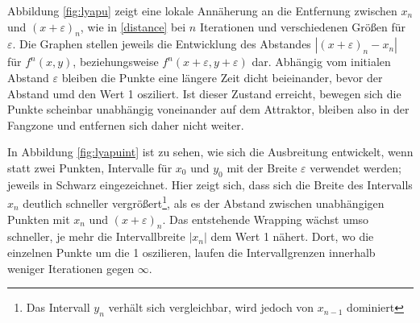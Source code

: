  
 Abbildung \ref{fig:lyapu} zeigt eine lokale Annäherung an die Entfernung zwischen $x_n$ und $(x+\varepsilon)_n$, wie in \ref{distance} bei $n$ Iterationen und verschiedenen Größen für $\varepsilon$. Die Graphen stellen jeweils die Entwicklung des Abstandes $|(x+\varepsilon)_n - x_n|$ für $f^n(x,y)$, beziehungsweise $f^n(x+\varepsilon,y+\varepsilon)$ dar. Abhängig vom initialen Abstand $\varepsilon$ bleiben die Punkte eine längere Zeit dicht beieinander, bevor der Abstand umd den Wert 1 osziliert. Ist dieser Zustand erreicht, bewegen sich die Punkte scheinbar unabhängig voneinander auf dem Attraktor, bleiben also in der Fangzone und entfernen sich daher nicht weiter. 

 
 
 In Abbildung \ref{fig:lyapuint} ist zu sehen, wie sich die Ausbreitung entwickelt, wenn statt zwei Punkten, Intervalle für $x_0$ und $y_0$ mit der Breite $\varepsilon$ verwendet werden; jeweils in Schwarz eingezeichnet. Hier zeigt sich, dass sich die Breite des Intervalls $x_n$ deutlich schneller vergrößert\footnote{Das Intervall $y_n$ verhält sich vergleichbar, wird jedoch von $x_{n-1}$ dominiert}, als es der Abstand zwischen unabhängigen Punkten mit $x_n$ und $(x+\varepsilon)_n$. Das entstehende Wrapping wächst umso schneller, je mehr die Intervallbreite $|x_n|$ dem Wert 1 nähert. Dort, wo die einzelnen Punkte um die 1 oszilieren, laufen die Intervallgrenzen innerhalb weniger Iterationen gegen $\infty$.
 
